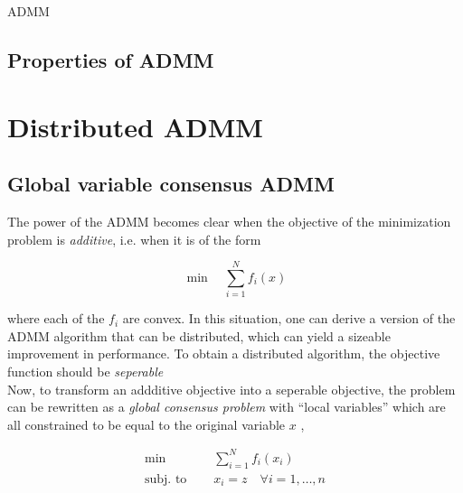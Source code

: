 \documentclass[11pt]{article}
\begin{document}
\begin{algorithm}[H]
    \caption{ADMM}

    \SetAlgoNoLine

\end{algorithm}

\subsection{Properties of ADMM}


\section{Distributed ADMM}

\subsection*{Global variable consensus ADMM}

The power of the ADMM becomes clear when the objective of the minimization problem is 
\textit{additive}, i.e. when it is of the form 

\begin{equation} \label{additive}
    \min \quad \sum_{i=1}^N f_i(x)
\end{equation}
    
where each of the $f_i$ are convex. In this situation, one can derive a version of the ADMM 
algorithm that can be distributed, which can yield a sizeable improvement in performance. 
To obtain a distributed algorithm, the objective function should be \emph{seperable} \\

Now, to transform an addditive objective into a seperable objective, the problem 
can be rewritten as a \emph{global consensus problem} with 
``local variables'' which are all constrained to be equal to the original
variable $x$ \cite{nedic201010}, 

\begin{equation}
\begin{aligned}
    \min \quad & \sum_{i=1}^N f_i(x_i) \\
    \textrm{subj. to } \quad & x_i = z \quad \forall i = 1, \ldots, n
\end{aligned}
\end{equation}
\end{document}

